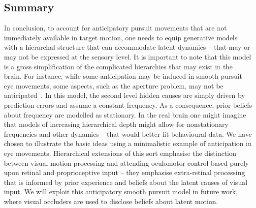 \documentclass[a4paper]{article} %
\begin{document}
\subsection{Summary}

In conclusion, to account for anticipatory pursuit movements that are
not immediately available in target motion, one needs to equip
generative models with a hierarchal structure that can accommodate
latent dynamics -- that may or may not be expressed at the sensory
level. %
It is important to note that this model is a gross simplification of the complicated hierarchies that may exist in the brain. For instance, while some anticipation may be induced in smooth pursuit eye movements, some aspects, such as the aperture problem, may not be anticipated~\citep{Montagnini06}. In this model, the second level hidden causes are simply driven by prediction errors and assume a constant frequency. As a consequence, prior beliefs about frequency are modelled as stationary. In the real brain one might imagine that models of increasing hierarchical depth might allow for nonstationary frequencies and other dynamics -- that would better fit behavioural data. We have chosen to illustrate the basic ideas using a minimalistic example of anticipation in eye movements. %
Hierarchical extensions of this sort emphasise the distinction between visual motion processing and attending oculomotor control based purely upon retinal and proprioceptive input -- they emphasise extra-retinal processing that is informed by prior experience and beliefs about the latent causes of visual input. We will exploit this anticipatory smooth pursuit model in future work, where visual occluders
are used to disclose beliefs about latent motion.
\end{document}
